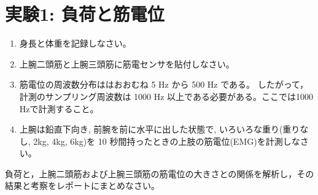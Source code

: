 \documentclass{jsarticle}
\begin{document}


\section{実験1: 負荷と筋電位}

\begin{enumerate}
  \item 身長と体重を記録しなさい。
  \item 上腕二頭筋と上腕三頭筋に筋電センサを貼付しなさい。
  \item 筋電位の周波数分布ははおおむね 5 Hz から 500 Hz である。
  したがって，計測のサンプリング周波数は 1000 Hz 以上である必要がある。ここでは1000 Hzで計測すること。
  \item 上腕は鉛直下向き, 前腕を前に水平に出した状態で, いろいろな重り(重りなし, 2kg, 4kg, 6kg)を 10 秒間持ったときの上肢の筋電位(EMG)を計測しなさい。
\end{enumerate}  


負荷と，上腕二頭筋および上腕三頭筋の筋電位の大きさとの関係を解析し，その結果と考察をレポートにまとめなさい。
\end{document}
